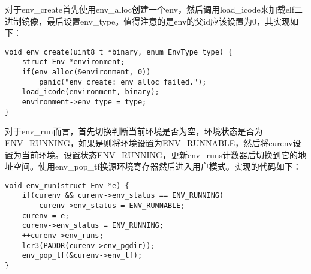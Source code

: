 \begin{exerciseSolution}{2}
    \par 对于env\_create首先使用env\_alloc创建一个env，然后调用load\_icode来加载elf二进制镜像，最后设置env\_type。值得注意的是env的父id应该设置为0，其实现如下：
    \begin{lstlisting}
void env_create(uint8_t *binary, enum EnvType type) {
    struct Env *environment;
    if(env_alloc(&environment, 0))
        panic("env_create: env_alloc failed.");
    load_icode(environment, binary);
    environment->env_type = type;
}
    \end{lstlisting}

    \par 对于env\_run而言，首先切换判断当前环境是否为空，环境状态是否为ENV\_RUNNING，如果是则将环境设置为ENV\_RUNNABLE，然后将curenv设置为当前环境。设置状态ENV\_RUNNING，更新env\_runs计数器后切换到它的地址空间。使用env\_pop\_tf换源环境寄存器然后进入用户模式。实现的代码如下：
    \begin{lstlisting}
void env_run(struct Env *e) {
    if(curenv && curenv->env_status == ENV_RUNNING)
        curenv->env_status = ENV_RUNNABLE;
    curenv = e;
    curenv->env_status = ENV_RUNNING;
    ++curenv->env_runs;
    lcr3(PADDR(curenv->env_pgdir));
    env_pop_tf(&curenv->env_tf);
}
    \end{lstlisting}
\end{exerciseSolution}

